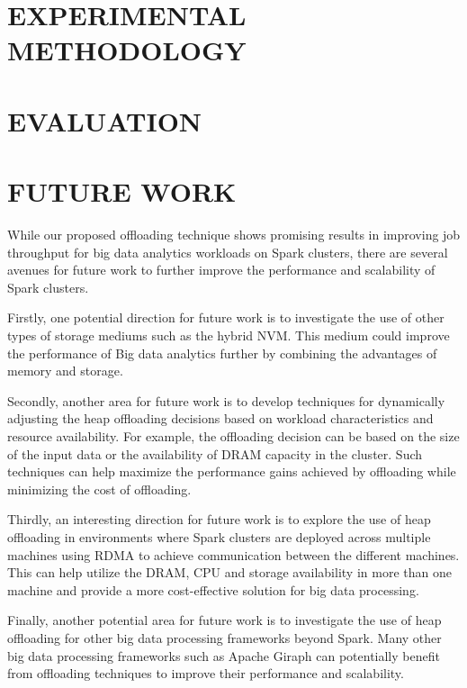 \documentclass[twocolumn,10pt]{asme2e}
\begin{document}
\section*{EXPERIMENTAL METHODOLOGY}

\section*{EVALUATION}

\section*{FUTURE WORK}

While our proposed offloading technique shows promising results in improving job throughput for big data analytics workloads on Spark clusters, there are several avenues for future work to further improve the performance and scalability of Spark clusters. 

Firstly, one potential direction for future work is to investigate the use of other types of storage mediums such as the hybrid NVM. This medium could improve the performance of Big data analytics further by combining the advantages of memory and storage.

Secondly, another area for future work is to develop techniques for dynamically adjusting the heap offloading decisions based on workload characteristics and resource availability. For example, the offloading decision can be based on the size of the input data or the availability of DRAM capacity in the cluster. Such techniques can help maximize the performance gains achieved by offloading while minimizing the cost of offloading.

Thirdly, an interesting direction for future work is to explore the use of heap offloading in environments where Spark clusters are deployed across multiple machines using RDMA to achieve communication between the different machines. This can help utilize the DRAM, CPU and storage availability in more than one machine and provide a more cost-effective solution for big data processing.

Finally, another potential area for future work is to investigate the use of heap offloading for other big data processing frameworks beyond Spark. Many other big data processing frameworks such as Apache Giraph can potentially benefit from offloading techniques to improve their performance and scalability.
\end{document}
